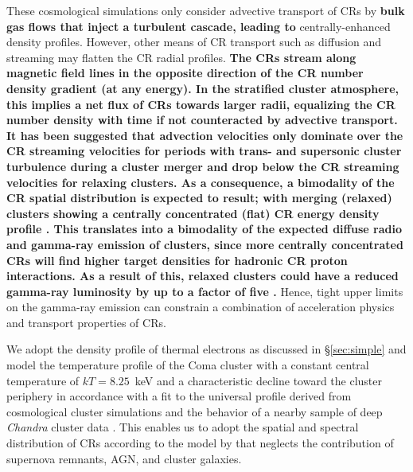 \documentclass[12pt,manuscript]{aastex}
\begin{document}
These cosmological simulations only consider advective transport of CRs by {\bf bulk gas flows that
  inject a turbulent cascade, leading to} centrally-enhanced density profiles. However, other means
of CR transport such as diffusion and streaming may flatten the CR radial profiles. {\bf The CRs
  stream along magnetic field lines in the opposite direction of the CR number density gradient (at
  any energy). In the stratified cluster atmosphere, this implies a net flux of CRs towards larger
  radii, equalizing the CR number density with time if not counteracted by advective transport. It
  has been suggested that advection velocities only dominate over the CR streaming velocities for
  periods with trans- and supersonic cluster turbulence during a cluster merger and drop below the
  CR streaming velocities for relaxing clusters.  As a consequence, a bimodality of the CR spatial
  distribution is expected to result; with merging (relaxed) clusters showing a centrally
  concentrated (flat) CR energy density profile
  \citep{article:EnsslinPfrommerMiniatiSubramanian:2011}. This translates into a bimodality of the
  expected diffuse radio and gamma-ray emission of clusters, since more centrally concentrated CRs
  will find higher target densities for hadronic CR proton interactions. As a result of this,
  relaxed clusters could have a reduced gamma-ray luminosity by up to a factor of five
  \citep{article:EnsslinPfrommerMiniatiSubramanian:2011}.}  Hence, tight upper limits on the
gamma-ray emission can constrain a combination of acceleration physics and transport properties of
CRs.

We adopt the density profile of thermal electrons as discussed in \S \ref{sec:simple} and model the
temperature profile
of the Coma cluster with a constant central temperature of $kT= 8.25$~keV and a characteristic
decline toward the cluster periphery in accordance with a fit to the universal profile derived from
cosmological cluster simulations \citep{article:PinzkePfrommer:2010, article:Pfrommer_etal:2007}
and the behavior of a nearby sample of deep {\em Chandra} cluster data
\citep{article:Vikhlinin_etal:2005}. This enables us to adopt the spatial and spectral distribution
of CRs according to the model by \citet{article:PinzkePfrommer:2010} that neglects the contribution of supernova remnants, AGN,
and cluster galaxies.
\end{document}
